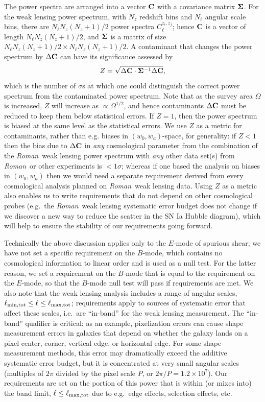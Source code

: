 \documentclass[usenatbib]{mnras}
\newcommand{\wfirst}{{\slshape Roman}}
\begin{document}
The power spectra are arranged into a vector ${\bf C}$ with
a covariance matrix ${\bf\Sigma}$. For the weak lensing power spectrum, with
$N_z$ redshift bins and $N_\ell$ angular scale bins, there are $N_\ell
N_z(N_z+1)/2$ power spectra $C_\ell^{z_i,z_j}$; hence ${\bf C}$ is a
vector of length $N_\ell N_z(N_z+1)/2$, and ${\bf\Sigma}$ is a matrix
of size $N_\ell N_z(N_z+1)/2 \times N_\ell N_z(N_z+1)/2$. A
contaminant that changes the power spectrum by $\Delta {\bf C}$ can
have its significance assessed by
\begin{equation}
Z = \sqrt{\Delta{\bf C}\cdot{\bf\Sigma}^{-1}\Delta{\bf C}},
\label{eq:alpha}
\end{equation}
which is the number of $\sigma$s at which one could distinguish the
correct power spectrum from the contaminated power spectrum. Note that
as the survey area $\Omega$ is increased, $Z$ will increase as
$\propto\Omega^{1/2}$, and hence contaminants $\Delta{\bf C}$ must be
reduced to keep them below statistical errors. If $Z=1$, then the
power spectrum is biased at the same level as the statistical
errors. We use $Z$ as a metric for contaminants, rather than
e.g. biases in $(w_0,w_a)$-space, for generality: if $Z<1$ then the
bias due to $\Delta{\bf C}$ in {\em any} cosmological parameter from
the combination of the \wfirst\ weak lensing power spectrum with {\em any} other
data set(s) from \wfirst\ or other experiments is $<1\sigma$; whereas if
one based the analysis on biases in $(w_0,w_a)$ then we would need a
separate requirement derived from every cosmological analysis planned
on \wfirst\ weak lensing data. Using $Z$ as a metric also enables us to write
requirements that do not depend on other cosmological probes (e.g.\
the \wfirst\ weak lensing systematic error budget does not change if we discover a
new way to reduce the scatter in the SN Ia Hubble diagram), which will
help to ensure the stability of our requirements going forward.

Technically the above discussion applies only to the $E$-mode of
spurious shear; we have not set a specific requirement on the
$B$-mode, which contains no cosmological information to linear order
and is used as a null test. For the latter reason, we set a
requirement on the $B$-mode that is equal to the requirement on the
$E$-mode, so that the $B$-mode null test will pass if requirements are
met. We also note that the weak lensing analysis includes a range of angular
scales, $\ell_{\rm min,tot}\le \ell \le \ell_{\rm max,tot}$;
requirements apply to sources of systematic error that affect these
scales, i.e.\ are ``in-band'' for the weak lensing measurement. The ``in-band''
qualifier is critical: as an example, pixelization errors can cause
shape measurement errors in galaxies that depend on whether the galaxy
lands on a pixel center, corner, vertical edge, or horizontal
edge. For some shape measurement methods, this error may dramatically
exceed the additive systematic error budget, but it is concentrated at
very small angular scales (multiples of $2\pi$ divided by the pixel
scale $P$, or $2\pi/P = 1.2\times 10^7$). Our requirements are set on
the portion of this power that is within (or mixes into) the band
limit, $\ell\le\ell_{\rm max,tot}$ due to e.g.\ edge effects,
selection effects, etc.
\end{document}
